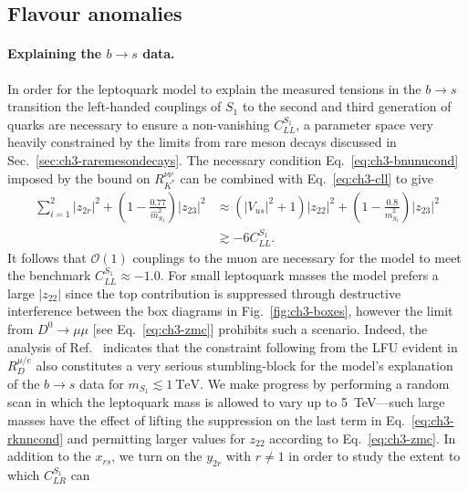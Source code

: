 \subsection{Flavour anomalies}

\paragraph{Explaining the $b \to s$ data.} In order for the leptoquark model to
explain the measured tensions in the $b \to s$ transition the left-handed
couplings of $S_{1}$ to the second and third generation of quarks are necessary
to ensure a non-vanishing $C_{LL}^{S_{1}}$, a parameter space very heavily
constrained by the limits from rare meson decays discussed in
Sec.~\ref{sec:ch3-raremesondecays}. The necessary condition Eq.~\eqref{eq:ch3-bnunucond}
imposed by the bound on $R_{K^{*}}^{\nu\nu}$ can be combined with Eq.~\eqref{eq:ch3-cll}
to give~\cite{Bauer:2015knc}
\begin{equation} \label{eq:ch3-rknncond}
  \begin{split}
    \sum_{i=1}^2 |z_{2r}|^2 + \left( 1 - \frac{0.77}{\hat{m}_{S_{1}}^2}
    \right) |z_{23}|^2 &\approx \left(|V_{us}|^2 + 1\right) |z_{22}|^2 +
    \left( 1 - \frac{0.8}{\hat{m}_{S_{1}}^2} \right) |z_{23}|^2\\ &\gtrsim - 6
    C_{LL}^{S_{1}}.
  \end{split}
\end{equation}
It follows that $\mathscr{O}(1)$ couplings to the muon are necessary for the
model to meet the benchmark $C_{LL}^{S_{1}} \approx -1.0$. For small leptoquark
masses the model prefers a large $|z_{22}|$ since the top contribution is
suppressed through destructive interference between the box diagrams in
Fig.~\ref{fig:ch3-boxes}, however the limit from $D^0 \to \mu \mu$ [see
Eq.~\eqref{eq:ch3-zmc}] prohibits such a scenario. Indeed, the analysis of
Ref.~\cite{Becirevic:2016oho} indicates that the constraint following from the
LFU evident in $R_D^{\mu/e}$ also constitutes a very serious stumbling-block for
the model's explanation of the $b \to s$ data for
$m_{S_{1}} \lesssim \SI{1}{\TeV}$. We make progress by performing a random scan
in which the leptoquark mass is allowed to vary up to \SI{5}{\TeV}---such large
masses have the effect of lifting the suppression on the last term in
Eq.~\eqref{eq:ch3-rknncond} and permitting larger values for $z_{22}$ according
to Eq.~\eqref{eq:ch3-zmc}. In addition to the $x_{rs}$, we turn on the $y_{2r}$
with $r \neq 1$ in order to study the extent to which $C_{LR}^{S_{1}}$ can
